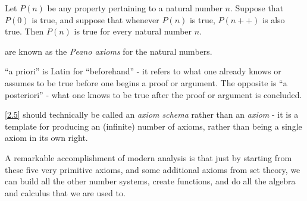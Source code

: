 \begin{axiom}\label{2.5}
  Let \(P(n)\) be any property pertaining to a natural number \(n\).
  Suppose that \(P(0)\) is true, and suppose that whenever \(P(n)\) is true, \(P(n++)\) is also true.
  Then \(P(n)\) is true for every natural number \(n\).
\end{axiom}

\begin{note}
   are known as the \emph{Peano axioms} for the natural numbers.
\end{note}

\begin{note}
  ``a priori'' is Latin for ``beforehand''
  - it refers to what one already knows or assumes to be true before one begins a proof or argument.
  The opposite is ``a posteriori''
  - what one knows to be true after the proof or argument is concluded.
\end{note}

\begin{note}
  \cref{2.5} should technically be called an \emph{axiom schema} rather than an \emph{axiom}
  - it is a template for producing an (infinite) number of axioms, rather than being a single axiom in its own right.
\end{note}

\begin{note}
  A remarkable accomplishment of modern analysis is that just by starting from these five very primitive axioms, and some additional axioms from set theory, we can build all the other number systems, create functions, and do all the algebra and calculus that we are used to.
\end{note}